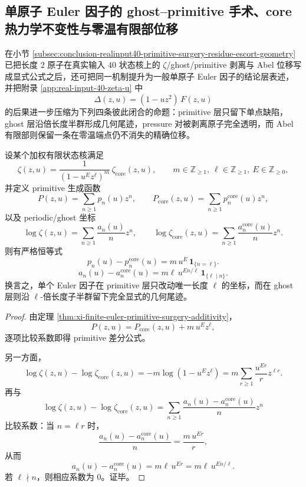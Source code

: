 \subsection{单原子 Euler 因子的 ghost--primitive 手术、core 热力学不变性与零温有限部位移}\label{subsec:conclusion-atomic-euler-ghost-primitive-core-zerotemp}
在小节 \ref{subsec:conclusion-realinput40-primitive-surgery-residue-escort-geometry} 已把长度 \(2\) 原子在真实输入 \(40\) 状态核上的 \(\zeta\)/ghost/primitive 剥离与 Abel 位移写成显式公式之后，还可把同一机制提升为一般单原子 Euler 因子的结论层表述，并把附录 \ref{app:real-input-40-zeta-u} 中
\[
\Delta(z,u)=(1-uz^2)\,F(z,u)
\]
的后果进一步压缩为下列四条彼此闭合的命题：primitive 层只留下单点缺陷，ghost 层沿倍长度半群形成几何尾迹，pressure 对被剥离原子完全透明，而 Abel 有限部则保留一条在零温端点仍不消失的精确位移。

\begin{theorem}\label{thm:conclusion-atomic-euler-ghost-primitive-complete-surgery}
设某个加权有限状态核满足
\[
\zeta(z,u)=\frac{1}{(1-u^Ez^\ell)^m}\,\zeta_{\mathrm{core}}(z,u),
\qquad
m\in\mathbb Z_{\ge 1},\ \ell\in\mathbb Z_{\ge 1},\ E\in\mathbb Z_{\ge 0},
\]
并定义 primitive 生成函数
\[
P(z,u)=\sum_{n\ge 1}p_n(u)z^n,
\qquad
P_{\mathrm{core}}(z,u)=\sum_{n\ge 1}p_n^{\mathrm{core}}(u)z^n,
\]
以及 periodic/ghost 坐标
\[
\log \zeta(z,u)=\sum_{n\ge 1}\frac{a_n(u)}{n}z^n,
\qquad
\log \zeta_{\mathrm{core}}(z,u)=\sum_{n\ge 1}\frac{a_n^{\mathrm{core}}(u)}{n}z^n.
\]
则有严格恒等式
\[
\boxed{\;
p_n(u)-p_n^{\mathrm{core}}(u)
=
m\,u^E\,\mathbf 1_{\{n=\ell\}}.\;}
\]
\[
\boxed{\;
a_n(u)-a_n^{\mathrm{core}}(u)
=
m\ell\,u^{En/\ell}\,\mathbf 1_{\{\ell\mid n\}}.\;}
\]
换言之，单个 Euler 因子在 primitive 层只改动唯一长度 \(\ell\) 的坐标，而在 ghost 层则沿 \(\ell\)-倍长度子半群留下完全显式的几何尾迹。
\end{theorem}
\begin{proof}
由定理 \ref{thm:xi-finite-euler-primitive-surgery-additivity}，
\[
P(z,u)=P_{\mathrm{core}}(z,u)+m\,u^Ez^\ell,
\]
逐项比较系数即得 primitive 差分公式。

另一方面，
\[
\log\zeta(z,u)-\log\zeta_{\mathrm{core}}(z,u)
=
-m\log(1-u^Ez^\ell)
=
m\sum_{r\ge 1}\frac{u^{Er}}{r}z^{\ell r}.
\]
再与
\[
\log\zeta(z,u)-\log\zeta_{\mathrm{core}}(z,u)
=
\sum_{n\ge 1}\frac{a_n(u)-a_n^{\mathrm{core}}(u)}{n}z^n
\]
比较系数：当 \(n=\ell r\) 时，
\[
\frac{a_n(u)-a_n^{\mathrm{core}}(u)}{n}
=
\frac{m\,u^{Er}}{r},
\]
从而
\[
a_n(u)-a_n^{\mathrm{core}}(u)=m\ell\,u^{Er}=m\ell\,u^{En/\ell}.
\]
若 \(\ell\nmid n\)，则相应系数为 \(0\)。证毕。
\end{proof}

